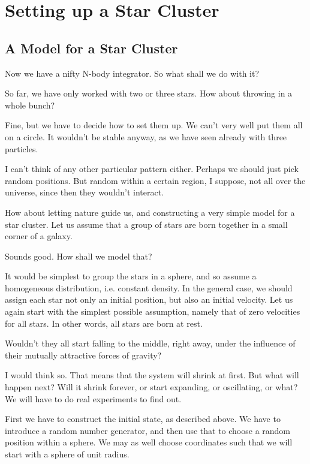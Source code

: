 \chapter{Setting up a Star Cluster}

\section{A Model for a Star Cluster}

\abc

\bob
Now we have a nifty N-body integrator.  So what shall we do with it?

\carol
So far, we have only worked with two or three stars.  How about
throwing in a whole bunch?

\bob
Fine, but we have to decide how to set them up.
We can't very well put them all on a circle.  It wouldn't be
stable anyway, as we have seen already with three particles.

\carol
I can't think of any other particular pattern either.  Perhaps
we should just pick random positions.  But random within a certain
region, I suppose, not all over the universe, since then they wouldn't
interact.

\alice
How about letting nature guide us, and constructing a very simple
model for a star cluster.  Let us assume that a group of stars are
born together in a small corner of a galaxy.

\bob
Sounds good.  How shall we model that?

\alice
It would be simplest to group the stars in a sphere, and so assume a
homogeneous distribution, i.e. constant density.  In the general case,
we should assign each star not only an initial position, but also an
initial velocity.  Let us again start with the simplest possible
assumption, namely that of zero velocities for all stars.  In other
words, all stars are born at rest.

\carol
Wouldn't they all start falling to the middle, right away, under the
influence of their mutually attractive forces of gravity?

\bob
I would think so.  That means that the system will shrink at first.
But what will happen next?  Will it shrink forever, or start
expanding, or oscillating, or what?  We will have to do real
experiments to find out.

\carol
First we have to construct the initial state, as described above.  We
have to introduce a random number generator, and then use that to
choose a random position within a sphere.  We may as well choose
coordinates such that we will start with a sphere of unit radius.

